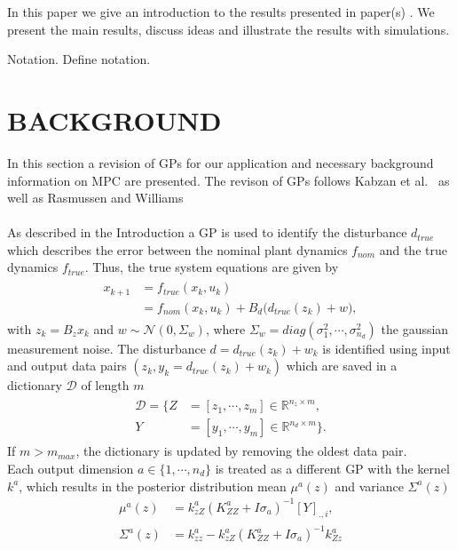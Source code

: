 \documentclass[letterpaper, 10 pt, conference]{ieeeconf}  %
\newcommand{\R}{\mathbb{R}}
\begin{document}
In this paper we give an introduction to the results presented in paper(s) \cite{Bro-14}.
We present the main results, discuss ideas and illustrate the results with simulations.

Notation. Define notation.

\section{BACKGROUND}

In this section a revision of GPs for our application and necessary background information on MPC are presented. The revison of GPs follows Kabzan et al.~\cite{kabzan2019learning} as well as Rasmussen and Williams~\cite{williams2006gaussian}\\
 \\
As described in the Introduction a GP is used to identify the disturbance $d_{true}$ which describes the error between the nominal plant dynamics $f_{nom}$ and the true dynamics $f_{true}$. Thus, the true system equations are given by
\begin{align}
\begin{split}
x_{k+1} &= f_{true}(x_k,u_k) \\
        &=  f_{nom}(x_k,u_k) + B_d\big(d_{true}(z_k)+ w\big),
\end{split}
\end{align}
with $z_k = B_z x_k$ and $w \sim \mathcal{N}(0,\Sigma_w)$, where $\Sigma_w= diag(\sigma_1^2, \cdots ,\sigma_{n_d}^2)$ the gaussian measurement noise.
The disturbance $d = d_{true}(z_k) + w_k$ is identified using input and output data pairs $(z_k,y_k=d_{true}(z_k)+w_k)$ which are saved in a dictionary $\mathcal{D}$ of length $m$
\begin{align}
\begin{split}
\mathcal{D} = \{Z &=[z_1, \cdots, z_m] \in \R^{n_z \times m} , \\
                Y &=[y_{1},\cdots,y_{m}]\in \R^{n_d \times m} \}.
\end{split}
\end{align}
If $m>m_{max}$, the dictionary is updated by removing the oldest data pair.\\
Each output dimension $a \in \{1, \cdots, n_d\}$ is treated as a different GP with the kernel $k^a$, which results in the posterior distribution mean $\mu^a(z)$ and variance $\Sigma^a(z)$
\begin{align}
\mu^a(z) &= k_{zZ}^a( K_{ZZ}^a +I \sigma_a)^{-1}[Y]_{.,i},\\
\Sigma^a(z) &= k_{zz}^a-k_{zZ}^a ( K_{ZZ}^a +I \sigma_a)^{-1} k_{Zz}^a
\end{align}
\end{document}
